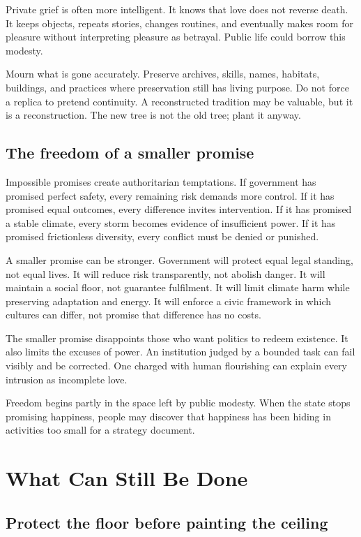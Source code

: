 \documentclass[12pt,a4paper]{book}
\begin{document}
Private grief is often more intelligent.  It knows that love does not reverse
death.  It keeps objects, repeats stories, changes routines, and eventually
makes room for pleasure without interpreting pleasure as betrayal.  Public
life could borrow this modesty.

Mourn what is gone accurately.  Preserve archives, skills, names, habitats,
buildings, and practices where preservation still has living purpose.  Do not
force a replica to pretend continuity.  A reconstructed tradition may be
valuable, but it is a reconstruction.  The new tree is not the old tree; plant
it anyway.

\section{The freedom of a smaller promise}

Impossible promises create authoritarian temptations.  If government has
promised perfect safety, every remaining risk demands more control.  If it has
promised equal outcomes, every difference invites intervention.  If it has
promised a stable climate, every storm becomes evidence of insufficient power.
If it has promised frictionless diversity, every conflict must be denied or
punished.

A smaller promise can be stronger.  Government will protect equal legal
standing, not equal lives.  It will reduce risk transparently, not abolish
danger.  It will maintain a social floor, not guarantee fulfilment.  It will
limit climate harm while preserving adaptation and energy.  It will enforce a
civic framework in which cultures can differ, not promise that difference has
no costs.

The smaller promise disappoints those who want politics to redeem existence.
It also limits the excuses of power.  An institution judged by a bounded task
can fail visibly and be corrected.  One charged with human flourishing can
explain every intrusion as incomplete love.

Freedom begins partly in the space left by public modesty.  When the state
stops promising happiness, people may discover that happiness has been hiding
in activities too small for a strategy document.

\chapter{What Can Still Be Done}
\label{chap:still-can-be-done}

\section{Protect the floor before painting the ceiling}
\end{document}
